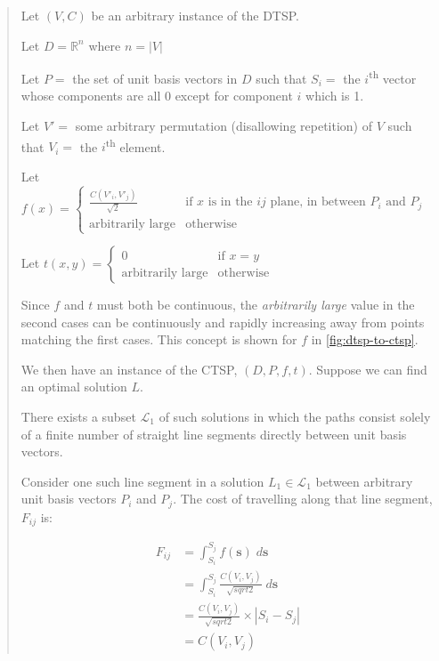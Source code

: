 \begin{quote}
  Let $(V, C)$ be an arbitrary instance of the DTSP.

  Let $D=\mathbb{R}^n$ where $n=\left|V\right|$

  Let $P=$ the set of unit basis vectors in $D$ such that $S_i=$ the $i$\textsuperscript{th} vector whose components are all 0 except for component $i$ which is 1.

  Let $V'=$ some arbitrary permutation (disallowing repetition) of $V$ such that $V_i=$ the $i$\textsuperscript{th} element.

  Let $f(x) = \begin{cases}
    \frac{C(V'_i, V'_j)}{\sqrt{2}}& \textrm{if $x$ is in the $ij$ plane, in between $P_i$ and $P_j$}\\ 
    \textrm{arbitrarily large}& \textrm{otherwise} 
   \end{cases}$
   
  Let $t(x,y) = \begin{cases}
    0& \textrm{if }x=y\\ 
    \textrm{arbitrarily large}& \textrm{otherwise} 
   \end{cases}$

  Since $f$ and $t$ must both be continuous, the \textit{arbitrarily large} value in the second cases can be continuously and rapidly increasing away from points matching the first cases. This concept is shown for $f$ in \ref{fig:dtsp-to-ctsp}.

  We then have an instance of the CTSP, $(D,P,f,t)$. Suppose we can find an optimal solution $L$.

  There exists a subset $\mathcal{L}_1$ of such solutions in which the paths consist solely of a finite number of straight line segments directly between unit basis vectors.

  Consider one such line segment in a solution $L_1 \in \mathcal{L}_1$ between arbitrary unit basis vectors $P_i$ and $P_j$. The cost of travelling along that line segment, $F_{ij}$ is:

  \begin{align}
    F_{ij} &= \int_{S_i}^{S_j} f(\mathbf{s})\;d\mathbf{s}\\
    &= \int_{S_i}^{S_j} \frac{C(V_i, V_j)}{\sqrt{sqrt{2}}}\;d\mathbf{s}\\
    &= \frac{C(V_i, V_j)}{\sqrt{sqrt{2}}} \times \left|S_i-S_j\right|\\
    &= C(V_i, V_j)\label{eq:1}
  \end{align}


\end{quote}
